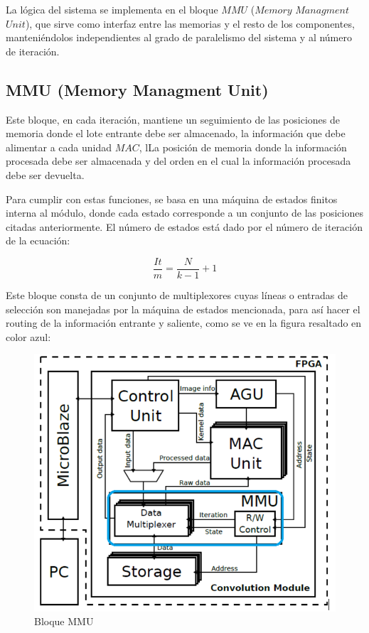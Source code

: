 \documentclass[a4paper]{article}
\begin{document}
La lógica del sistema se implementa en el bloque $MMU$ ($Memory$ $Managment$ $Unit$), que sirve como interfaz entre las memorias y el resto de los componentes, 
manteniéndolos independientes al grado de paralelismo del sistema y al número de iteración.

\bigskip

\subsection {MMU (Memory Managment Unit) }  \label{mmu_subsecc}
Este bloque, en cada iteración, mantiene un seguimiento de las posiciones de memoria donde el lote entrante debe ser almacenado,
la información que debe alimentar a cada unidad $MAC$, lLa posición de memoria donde la información procesada debe ser almacenada
y del orden en el cual la información procesada debe ser devuelta.

Para cumplir con estas funciones, se basa en una máquina de estados finitos interna al módulo, donde cada estado corresponde a un conjunto de las posiciones citadas anteriormente.
El número de estados está dado por el número de iteración de la ecuación:

\begin{equation}\label{niter}
  \frac{It}{m} = \frac{N}{k-1} + 1
\end{equation}
\bigskip

Este bloque consta de un conjunto de multiplexores cuyas líneas o entradas de selección son manejadas por la máquina de estados mencionada, para así hacer el routing de la información entrante y saliente, como se ve en la figura resaltado en color azul:
\begin{figure}[H]
\centering
\includegraphics[scale=0.8]{arq_blue.png}
\caption{Bloque MMU}
\label{mmu_location}
\end{figure}
\end{document}

